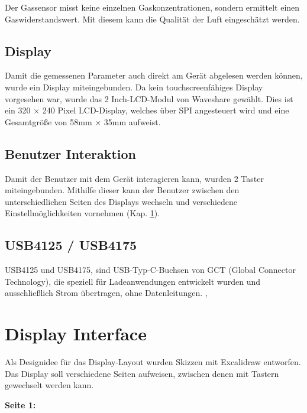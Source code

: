 \begin{inhalt}
Der Gassensor misst keine einzelnen Gaskonzentrationen, sondern ermittelt einen Gaswiderstandswert. Mit diesem kann die Qualität der Luft eingeschätzt werden. \cite{BME688}

\subsection{Display}

Damit die gemessenen Parameter auch direkt am Gerät abgelesen werden können, wurde ein Display miteingebunden. Da kein touchscreenfähiges Display vorgesehen war, wurde das 2 Inch-LCD-Modul von Waveshare gewählt. Dies ist ein 320 × 240 Pixel LCD-Display, welches über SPI angesteuert wird und eine Gesamtgröße von 58mm × 35mm aufweist. \cite{2Inch LCD Display Wiki}

\subsection{Benutzer Interaktion}

Damit der Benutzer mit dem Gerät interagieren kann, wurden 2 Taster miteingebunden. Mithilfe dieser kann der Benutzer zwischen den unterschiedlichen Seiten des Displays wechseln und verschiedene Einstellmöglichkeiten vornehmen (Kap. \ref{sec:display interface}).

\subsection{USB4125 / USB4175} \label{sec:USB4125_75}

USB4125 und USB4175, sind USB-Typ-C-Buchsen von GCT (Global Connector Technology), die speziell für Ladeanwendungen entwickelt wurden und ausschließlich Strom übertragen, ohne Datenleitungen. \cite{USB4125}, \cite{USB4175}

\section{Display Interface} \label{sec:display interface}

Als Designidee für das Display-Layout wurden Skizzen mit Excalidraw \cite{Excalidraw} entworfen. Das Display soll verschiedene Seiten aufweisen, zwischen denen mit Tastern gewechselt werden kann. 

\smallskip

\begin{center}
    \textbf{Seite 1:}
\end{center}


\end{inhalt}
